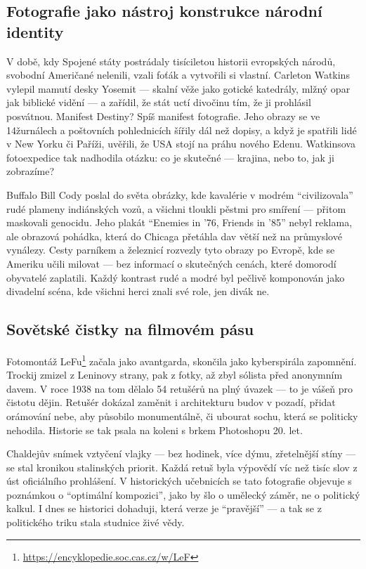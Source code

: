 \documentclass[12pt]{article} %
\begin{document}
\subsection{Fotografie jako nástroj konstrukce národní identity}
V době, kdy Spojené státy postrádaly tisíciletou historii evropských národů, svobodní Američané nelenili, vzali foťák a 
vytvořili si vlastní. Carleton Watkins vylepil mamutí desky 
Yosemit — skalní věže jako gotické katedrály, mlžný opar jak biblické vidění — a zařídil, že stát uctí divočinu tím, že 
ji prohlásil posvátnou. Manifest Destiny? Spíš manifest fotografie. Jeho obrazy se ve 14žurnálech a poštovních 
pohlednicích šířily dál než dopisy, a když je spatřili lidé v New Yorku či Paříži, uvěřili, že USA stojí na práhu 
nového Edenu. Watkinsova fotoexpedice tak nadhodila otázku: co je skutečné — krajina, nebo to, jak ji zobrazíme?

Buffalo Bill Cody poslal do světa obrázky, kde kavalérie v modrém \enquote{civilizovala} rudé plameny indiánských vozů, 
a všichni tloukli pěstmi pro smíření — přitom maskovali genocidu. Jeho plakát \enquote{Enemies in '76, Friends in '85} 
nebyl reklama, ale obrazová pohádka, která do Chicaga přetáhla dav větší než na průmyslové vynálezy. Cesty parníkem a 
železnicí rozvezly tyto obrazy po Evropě, kde se Ameriku učili milovat — bez informací o skutečných cenách, které 
domorodí obyvatelé zaplatili. Každý kontrast rudé a modré byl pečlivě komponován jako divadelní scéna, kde všichni herci 
znali své role, jen divák ne.

\subsection{Sovětské čistky na filmovém pásu}
Fotomontáž LeFu\footnote{\url{https://encyklopedie.soc.cas.cz/w/LeF}} začala jako avantgarda, skončila jako kyberspirála 
zapomnění. Trockij zmizel z Leninovy strany, pak z fotky, až zbyl sólista před anonymním davem. V roce 1938 na tom 
dělalo 54 retušérů na plný úvazek — to je vášeň pro čistotu dějin. Retušér dokázal zaměnit i architekturu budov v 
pozadí, přidat orámování nebe, aby působilo monumentálně, či ubourat sochu, která se politicky nehodila. Historie se tak 
psala na koleni s brkem Photoshopu 20. let.

Chaldejův snímek vztyčení vlajky — bez hodinek, více dýmu, zřetelnější stíny — se stal kronikou stalinských priorit. 
Každá retuš byla výpovědí víc než tisíc slov z úst oficiálního prohlášení. V historických učebnicích se tato fotografie 
objevuje s poznámkou o \enquote{optimální kompozici}, jako by šlo o umělecký záměr, ne o politický kalkul. I dnes se 
historici dohaduji, která verze je \enquote{pravější} — a tak se z politického triku stala studnice živé vědy.
\end{document}
